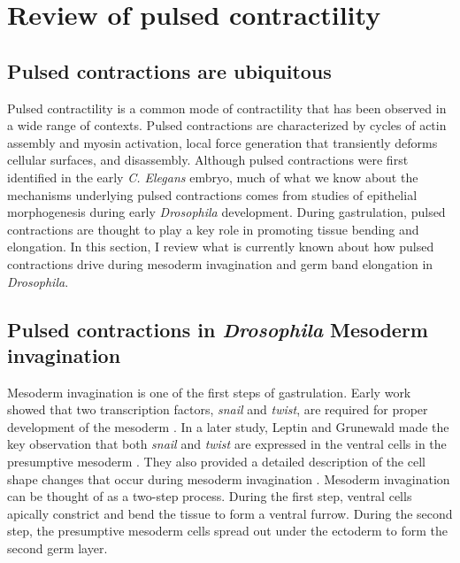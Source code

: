\documentclass{ucetd}
\begin{document}
\section{Review of pulsed contractility}
\subsection{Pulsed contractions are ubiquitous}
Pulsed contractility is a common mode of contractility that has been observed in a wide range of contexts.  Pulsed contractions are characterized by cycles of actin assembly and myosin activation, local force generation that transiently deforms cellular surfaces, and disassembly.  Although pulsed contractions were first identified in the early \textit{C. Elegans} embryo, much of what we know about the mechanisms underlying pulsed contractions comes from studies of epithelial morphogenesis during early \textit{Drosophila} development.  During gastrulation, pulsed contractions are thought to play a key role in promoting tissue bending and elongation.  In this section, I review what is currently known about how pulsed contractions drive during mesoderm invagination and germ band elongation in \textit{Drosophila}.


\subsection{Pulsed contractions in \textit{Drosophila} Mesoderm invagination}
Mesoderm invagination is one of the first steps of  gastrulation.  Early work showed that two transcription factors, \textit{snail} and \textit{twist}, are required for proper development of the mesoderm \cite{Simpson:1983wv}.  In a later study, Leptin and Grunewald made the key observation that both \textit{snail} and \textit{twist} are expressed in the ventral cells in the presumptive mesoderm \cite{Leptin:1990ub}.  They also provided a detailed description of the cell shape changes that occur during mesoderm invagination \cite{Leptin:1990ub}.  Mesoderm invagination can be thought of as a two-step process.  During the first step, ventral cells apically constrict and bend the tissue to form a ventral furrow.  During the second step, the presumptive mesoderm cells spread out under the ectoderm to form the second germ layer.  
\end{document}
